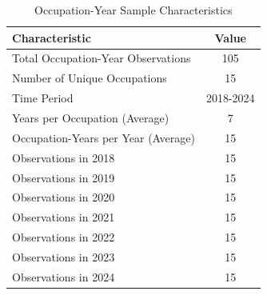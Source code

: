 \begin{table}[htbp]
\caption{Occupation-Year Sample Characteristics}
\label{tab:sample_characteristics}
\begin{tabular}{lc}
\hline\hline
Characteristic & Value \\
\hline
Total Occupation-Year Observations & 105 \\
Number of Unique Occupations & 15 \\
Time Period & 2018-2024 \\
Years per Occupation (Average) & 7 \\
Occupation-Years per Year (Average) & 15 \\
Observations in 2018 & 15 \\
Observations in 2019 & 15 \\
Observations in 2020 & 15 \\
Observations in 2021 & 15 \\
Observations in 2022 & 15 \\
Observations in 2023 & 15 \\
Observations in 2024 & 15 \\
\hline\hline
\end{tabular}
\end{table}
